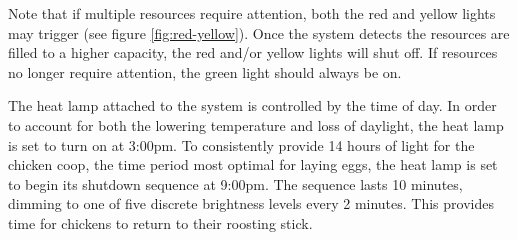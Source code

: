 \documentclass{article}
\begin{document}
Note that if multiple resources require attention, both the red and yellow lights may trigger (see figure \ref{fig:red-yellow}). Once the system detects the resources are filled to a higher capacity, the red and/or yellow lights will shut off. If resources no longer require attention, the green light should always be on.

The heat lamp attached to the system is controlled by the time of day. In order to account for both the lowering temperature and loss of daylight, the heat lamp is set to turn on at 3:00pm. To consistently provide 14 hours of light for the chicken coop, the time period most optimal for laying eggs, the heat lamp is set to begin its shutdown sequence at 9:00pm. The sequence lasts 10 minutes, dimming to one of five discrete brightness levels every 2 minutes. This provides time for chickens to return to their roosting stick.
\end{document}
